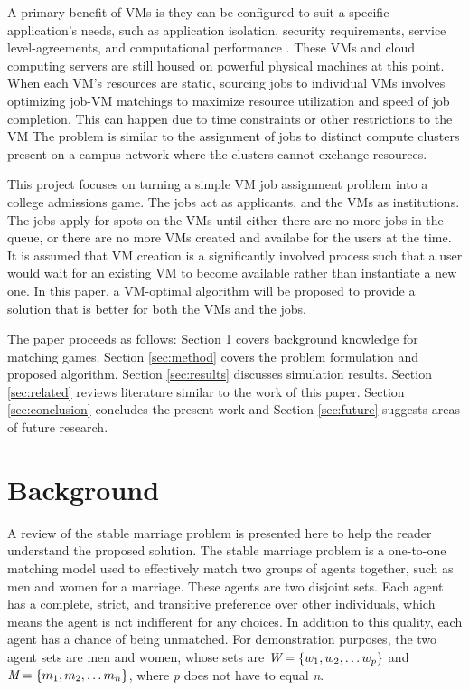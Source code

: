 \documentclass[conference]{IEEEtran}
\begin{document}
A primary benefit of VMs
is they can be configured to suit a specific application's
needs, such as application isolation, security requirements,
service level-agreements, and computational performance \cite{dhillon_virtual_2013}.  
These VMs and cloud computing servers
are still housed on powerful physical machines at this point.
When each VM's resources are static, 
sourcing jobs to individual VMs involves optimizing
job-VM matchings to maximize resource utilization and
speed of job completion.  This can happen due to time constraints or other restrictions to the VM
The problem is similar to the assignment of jobs to 
distinct compute clusters present on a campus network
where the clusters cannot exchange resources.

This project focuses on turning a simple VM job assignment
problem into a college admissions game.  The jobs act as applicants,
and the VMs as institutions.  The jobs apply for spots
on the VMs until either there are no more jobs in the 
queue, or there are no more VMs created and availabe for the
users at the time.  
It is assumed that VM creation is a significantly 
involved process such that a user would 
wait for an existing VM to become available
rather than instantiate a new one.
In this paper,
a VM-optimal algorithm will be proposed to provide a solution
that is better for both the VMs and the jobs.  

The paper proceeds as follows:  Section \ref{sec:background} covers 
background knowledge for matching games.  Section \ref{sec:method}
covers the problem formulation and proposed algorithm. Section
\ref{sec:results} discusses simulation results.  Section \ref{sec:related} 
reviews literature similar to the work of this paper.  
Section \ref{sec:conclusion} concludes the present work  
and Section \ref{sec:future} 
suggests areas of future research.

\section{Background}
\label{sec:background}
A review of the stable marriage problem is presented here 
to help the reader understand the proposed solution.
The stable marriage problem is a one-to-one matching
model used to effectively match two groups of agents
 together, such as men and women for a marriage.  
These agents are two disjoint sets.  Each agent
has a complete, strict, and  transitive preference over other
individuals, which means the agent is not indifferent for any choices.  
In addition to this quality, each agent has a chance
of being unmatched. For demonstration purposes,
the two agent sets are men and women, whose sets are 
\( \emph{W} = \{ {w_1}, {w_2}, \ldots {w_p} \} \) and
\( \emph{M} =\{ {m_1}, {m_2}, \ldots {m_n} \} \), 
where \emph{p} does not have to equal \emph{n}.
\end{document}
